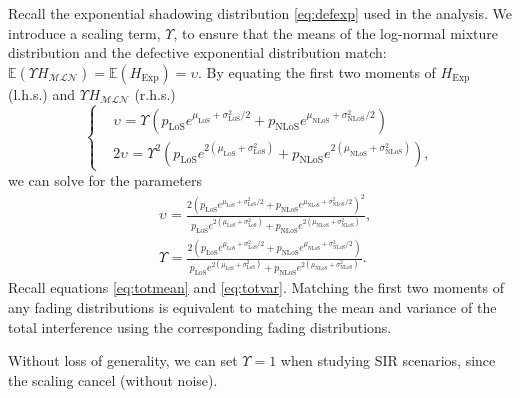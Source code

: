 \documentclass[lettersize,journal]{IEEEtran}
\begin{document}
Recall the exponential shadowing distribution \eqref{eq:defexp} used in the analysis. We introduce a scaling term, $\Upsilon$, to ensure that the means of the log-normal mixture distribution and the defective exponential distribution match: $\mathbb{E}(\Upsilon H_{\mathcal{MLN}}) = \mathbb{E}(H_{\text{Exp}}) = \upsilon$. By equating the first two moments of $H_{\text{Exp}}$ (l.h.s.) and $\Upsilon_{} H_{\mathcal{M} \mathcal{L}\mathcal{N}}$ (r.h.s.)
\begin{equation}
  \label{eq:matchingmoments}
  \begin{cases}
    &\upsilon_{} = \Upsilon_{} \left(p_{\text{LoS}} e^{\mu_{\text{LoS}} + \sigma_{\text{LoS}}^2/2} + p_{\text{NLoS}} e^{\mu_{\text{NLoS}} + \sigma_{\text{NLoS}}^2/2}\right)\\
    &2\upsilon_{}= \Upsilon_{}^2 \left( p_{\text{LoS}} e^{2(\mu_{\text{LoS}} + \sigma_{\text{LoS}}^2)} + p_{\text{NLoS}} e^{2(\mu_{\text{NLoS}} + \sigma_{\text{NLoS}}^2)} \right), 
  \end{cases}
\end{equation}
 we can solve for the parameters
\begin{align}
  \label{eq:upsilon}
  & \upsilon_{}= \frac{ 2\left( p_{\text{LoS}}e^{\mu_{\text{LoS}}+\sigma^2_{\text{LoS}}/2}+p_{\text{NLoS}}e^{\mu_{\text{NLoS}}+\sigma^2_{\text{NLoS}}/2} \right)^2}{p_{\text{LoS}}e^{2(\mu_{\text{LoS}}+\sigma_{\text{LoS}}^2)}+p_{\text{NLoS}}e^{2(\mu_{\text{NLoS}}+\sigma_{\text{NLoS}}^2)}}, \\
    \label{eq:Upsilon}
    &\Upsilon_{} = \frac{2\left(p_{\text{LoS}}e^{\mu_{\text{LoS}}+\sigma^2_{\text{LoS}}/2}+p_{\text{NLoS}}e^{\mu_{\text{NLoS}}+\sigma^2_{\text{NLoS}}/2}\right)}{p_{\text{LoS}}e^{2(\mu_{\text{LoS}}+\sigma_{\text{LoS}}^2)}+p_{\text{NLoS}}e^{2(\mu_{\text{NLoS}}+\sigma_{\text{NLoS}}^2)}}.
\end{align}
Recall equations \eqref{eq:totmean} and \eqref{eq:totvar}. Matching the first two moments of any fading distributions is equivalent to matching the mean and variance of the total interference using the corresponding fading distributions.


Without loss of generality, we can set $\Upsilon = 1$ when studying SIR scenarios, since the scaling cancel (without noise).

\end{document}
